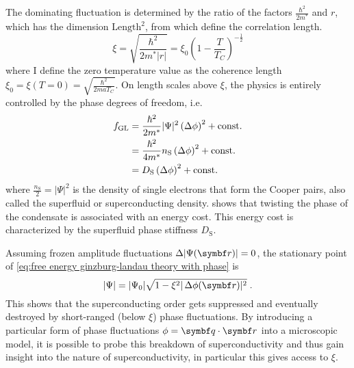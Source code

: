 \documentclass[../notes.tex]{subfiles}
\begin{document}
The dominating fluctuation is determined by the ratio of the factors \(\frac{\hbar^2}{2m^*}\) and \(r\), which has the dimension \(\mathrm{Length}^2\), from which define the correlation length.
\begin{equation}
	\xi = \sqrt{\frac{\hbar^2}{2m^* \vert r \vert}} = \xi_0 \left(1 - \frac{T}{T_C}\right)^{-\frac{1}{2}}
	\label{eq:correlation length GL theory}
\end{equation}
where I define the zero temperature value as the coherence length \(\xi_0 = \xi(T=0) = \sqrt{\frac{\hbar^2}{2 m a T_C}}\).
On length scales above \(\xi\), the physics is entirely controlled by the phase degrees of freedom, i.e.
\begin{align}
	f_{\mathrm{GL}} &= \frac{\hbar^2}{2 m^*} \vert \Psi \vert^2 \left(\adif{\phi}\right)^2 + \mathrm{const.} \\
	&= \frac{\hbar^2}{4 m^*} n_{\mathrm{S}} \left(\adif{\phi}\right)^2 + \mathrm{const.} \\
	&= D_{\mathrm{S}} \left(\adif{\phi}\right)^2 + \mathrm{const.} \label{eq:GL energy above correlation length}
\end{align}
where \(\frac{n_{\mathrm{S}}}{2} = \vert \Psi \vert^2\) is the density of single electrons that form the Cooper pairs, also called the superfluid or superconducting density.
 shows that twisting the phase of the condensate is associated with an energy cost.
This energy cost is characterized by the superfluid phase stiffness \(D_{\mathrm{S}}\).


Assuming frozen amplitude fluctuations \(\adif{\vert \Psi (\vb{r}) \vert} = 0\), the stationary point of \cref{eq:free energy ginzburg-landau theory with phase} is
\begin{equation}
	\vert \Psi \vert = \vert \Psi_0 \vert \sqrt{1 - \xi^2 \vert \adif{\phi} (\vb{r}) \vert^2} \;.
	\label{eq:breakdown of OP with phase fluctuations}
\end{equation}
This shows that the superconducting order gets suppressed and eventually destroyed by short-ranged (below \(\xi\)) phase fluctuations.
By introducing a particular form of phase fluctuations \(\phi = \vb{q} \cdot \vb{r}\) into a microscopic model, it is possible to probe this breakdown of superconductivity and thus gain insight into the nature of superconductivity, in particular this gives access to \(\xi\).
\end{document}
